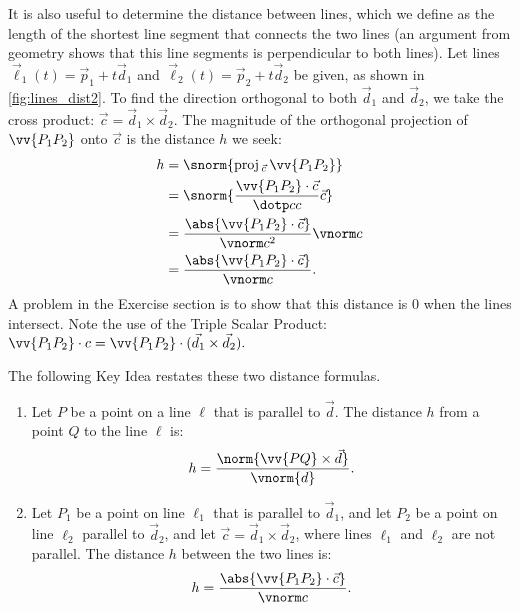 It is also useful to determine the distance between lines, which we define as the length of the shortest line segment that connects the two lines (an argument from geometry shows that this line segments is perpendicular to both lines). Let lines $\vec\ell_1(t) = \vec p_1 + t\vec d_1$ and $\vec\ell_2(t) = \vec p_2 + t\vec d_2$ be given, as shown in \autoref{fig:lines_dist2}. To find the direction orthogonal to both $\vec d_1$ and $\vec d_2$, we take the cross product: $\vec c = \vec d_1\times \vec d_2$. The magnitude of the orthogonal projection of $\vv{P_1P_2}$ onto $\vec c$ is the distance $h$ we seek:
\begin{align*}
h&=		\snorm{\text{proj}\,_{\vec c}\,\vv{P_1P_2}}\\
	&= \snorm{\frac{\vv{P_1P_2}\cdot\vec c}{\dotp cc}\vec c}\\
	&=\frac{\abs{\vv{P_1P_2}\cdot \vec c}}{\vnorm c^2}\vnorm c\\
	&=\frac{\abs{\vv{P_1P_2}\cdot \vec c}}{\vnorm c}.
\end{align*}
A problem in the Exercise section is to show that this distance is 0 when the lines intersect. Note the use of the Triple Scalar Product: $\vv{P_1P_2}\cdot c = \vv{P_1P_2}\cdot (\vec d_1\times \vec d_2).$


The following Key Idea restates these two distance formulas.

{\begin{enumerate}
	\item Let $P$ be a point on a line $\ell$ that is parallel to $\vec d$. The distance $h$ from a point $Q$ to the line $\ell$ is:
	$$h =\frac{\norm{\vv{PQ}\times \vec d}}{\vnorm{d}}.$$
	\item	Let $P_1$ be a point on line $\ell_1$ that is parallel to $\vec d_1$, and let $P_2$ be a point on line $\ell_2$ parallel to $\vec d_2$, and let $\vec c = \vec d_1\times \vec d_2$, where lines $\ell_1$ and $\ell_2$ are not parallel. The distance $h$ between the two lines is:
	$$h=\frac{\abs{\vv{P_1P_2}\cdot \vec c}}{\vnorm c}.$$
\end{enumerate}}

